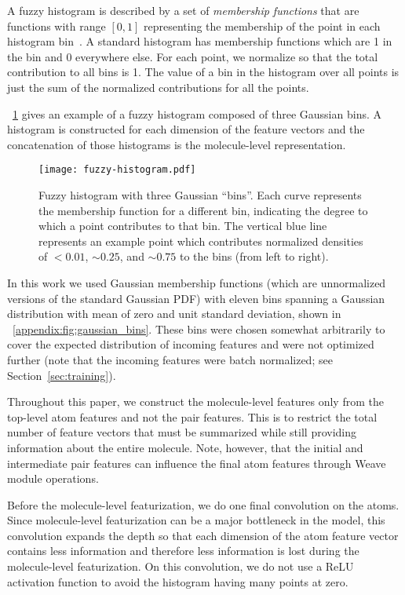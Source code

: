 A fuzzy histogram is described by a set of \emph{membership functions} that are
functions with range $[0, 1]$ representing the membership of the point in each
histogram bin~\citep{zadeh1965fuzzy}. A standard histogram has membership functions which
are 1 in the bin and 0 everywhere else. For each point, we normalize so that the
total contribution to all bins is 1. The value of a bin in the histogram over
all points is just the sum of the normalized contributions for all the points.

\figurename~\ref{fig:fuzzy_histogram} gives an example of a fuzzy histogram
composed of three Gaussian bins. A histogram is constructed for each dimension
of the feature vectors and the concatenation of those histograms is the
molecule-level representation.

\begin{figure}[tb]
\centering
  \texttt{[image: fuzzy-histogram.pdf]}
  \caption{
    Fuzzy histogram with three Gaussian ``bins''. Each curve represents the
    membership function for a different bin, indicating the degree to which a
    point contributes to that bin. The vertical blue line represents an example
    point which contributes normalized densities of $<0.01$, $\sim0.25$, and
    $\sim0.75$ to the bins (from left to right).
  }
  \label{fig:fuzzy_histogram}
\end{figure}

In this work we used Gaussian membership functions (which are unnormalized
versions of the standard Gaussian PDF) with eleven bins spanning a Gaussian
distribution with mean of zero and unit standard deviation, shown in
\figurename~\ref{appendix:fig:gaussian_bins}. These bins were chosen somewhat arbitrarily to cover the
expected distribution of incoming features and were not optimized further (note
that the incoming features were batch normalized; see
Section~\ref{sec:training}).

Throughout this paper, we construct the molecule-level features only from the
top-level atom features and not the pair features. This is to restrict the total
number of feature vectors that must be summarized while still providing
information about the entire molecule. Note, however, that the initial and
intermediate pair features can influence the final atom features through Weave
module operations.

Before the molecule-level featurization, we do one final convolution on the
atoms. Since molecule-level featurization can be a major bottleneck in the
model, this convolution expands the depth so that each dimension of the atom
feature vector contains less information and therefore less information is lost
during the molecule-level featurization. On this convolution, we do not use a
ReLU activation function to avoid the histogram having many points at zero.

